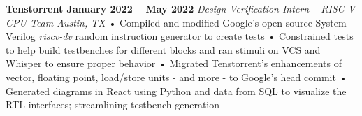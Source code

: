\documentclass[../main.tex]{subfiles}
\begin{document}
%
\noindent\textbf{{\fontsize{\textFontSize}{\textFontBox}\selectfont Tenstorrent \hfill January 2022 – May 2022}}
\vspace{0.5mm}\newline
%
%
{\fontsize{\textFontSize}{\textFontBox}\selectfont\emph{Design Verification Intern – RISC-V CPU Team \hfill Austin, TX \hspace{0 cm}}}\vspace{0mm}\newline
%
%
{\fontsize{\textFontSize}{\textFontBox}\selectfont • \hspace{1mm} Compiled and modified Google’s open-source System Verilog \emph{riscv-dv} random instruction generator to create tests }\newline
{\fontsize{\textFontSize}{\textFontBox}\selectfont • \hspace{1mm} Constrained tests to help build testbenches for different blocks and ran stimuli on VCS and Whisper to ensure proper behavior }\newline
{\fontsize{\textFontSize}{\textFontBox}\selectfont • \hspace{1mm} Migrated Tenstorrent’s enhancements of vector, floating point, load/store units - and more - to Google’s head commit }\newline
{\fontsize{\textFontSize}{\textFontBox}\selectfont • \hspace{1mm} Generated diagrams in React using Python and data from SQL to visualize the RTL interfaces; streamlining testbench generation }\vspace{1mm}\newline
%
%
\end{document}
